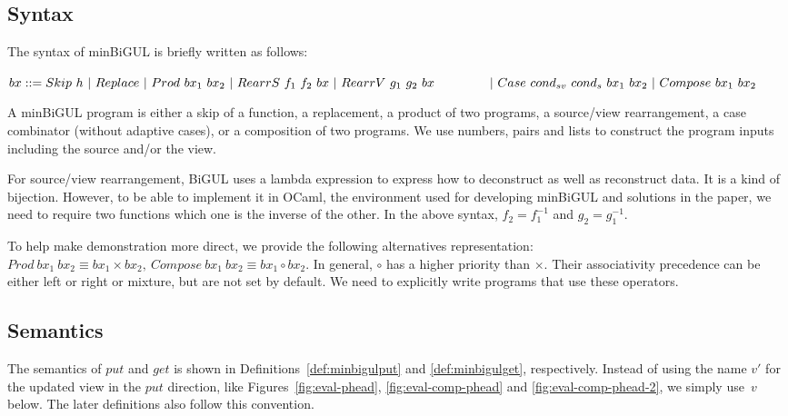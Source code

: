 \subsection{Syntax}

The syntax of minBiGUL is briefly written as follows:

\smallvspace
    $bx ::= Skip \ h \
        | \ Replace \
        | \ Prod \ bx_1 \ bx_2 \
        | \ RearrS \ f_1 \ f_2 \ bx \
        | \ RearrV \ g_1 \ g_2 \ bx \\
    \qtabs{2} | \ Case \ cond_{sv} \ cond_{s} \ bx_1 \ bx_2 \
        | \ Compose \ bx_1 \ bx_2$
\smallvspace
        
A minBiGUL program is either a skip of a function, a replacement, a product of two 
programs, a source/view rearrangement, a case combinator (without adaptive cases), or a composition of 
two programs. We use numbers, pairs and lists to construct the program inputs including the source and/or the view.

For source/view rearrangement, BiGUL uses 
a lambda expression to express how to deconstruct as well as reconstruct data. It is a kind of bijection. However, to be able to implement it in OCaml, the environment used for developing minBiGUL and solutions in the paper, we need to require two functions which one is the inverse of the other. In the above syntax, $f_2 = f_1^{-1}$ and $g_2 = g_1^{-1}$.

To help make demonstration more direct, we provide the following alternatives representation: $Prod \ bx_1 \ bx_2 \equiv bx_1 \times bx_2, \ Compose \ bx_1 \ bx_2 \equiv bx_1 \circ bx_2$. In general, $\circ$ has a higher priority than $\times$. Their associativity precedence can be either left or right or mixture, but are not set by default. We need to explicitly write programs that use these operators.

\subsection{Semantics}

The semantics of $put$ and $get$ is shown in Definitions~\ref{def:minbigulput} and \ref{def:minbigulget}, respectively. Instead of using the name $v'$ for the updated view in the $put$ direction, like Figures~\ref{fig:eval-phead}, \ref{fig:eval-comp-phead} and \ref{fig:eval-comp-phead-2}, we 
simply 
use~$v$ below. The later definitions also follow this convention.

